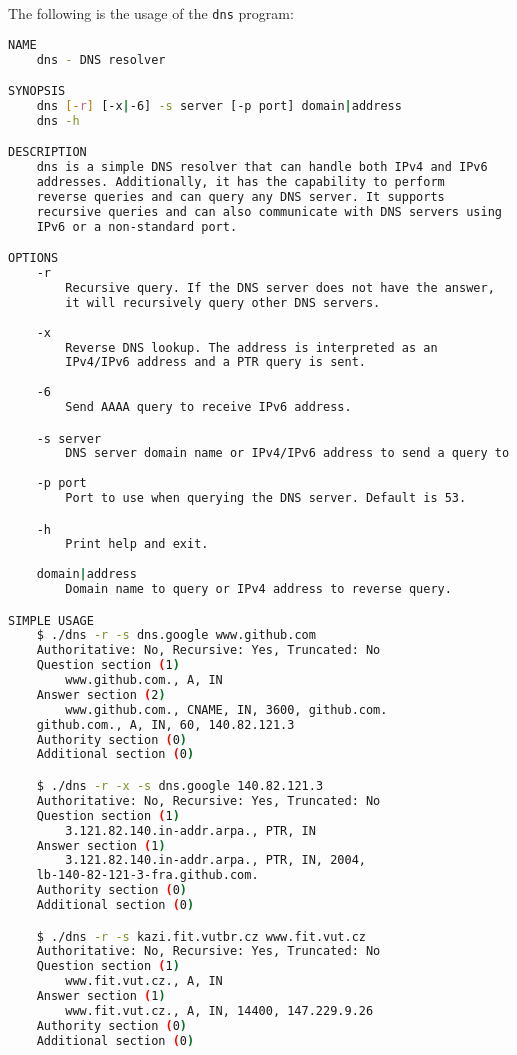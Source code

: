 \documentclass[a4paper, 11pt]{article}
\begin{document}
    The following is the usage of the \texttt{dns} program:
    \begin{lstlisting}[language=bash]
NAME
    dns - DNS resolver

SYNOPSIS
    dns [-r] [-x|-6] -s server [-p port] domain|address
    dns -h

DESCRIPTION
    dns is a simple DNS resolver that can handle both IPv4 and IPv6 
    addresses. Additionally, it has the capability to perform 
    reverse queries and can query any DNS server. It supports 
    recursive queries and can also communicate with DNS servers using 
    IPv6 or a non-standard port. 

OPTIONS
    -r
        Recursive query. If the DNS server does not have the answer, 
        it will recursively query other DNS servers.
    
    -x
        Reverse DNS lookup. The address is interpreted as an 
        IPv4/IPv6 address and a PTR query is sent.
    
    -6
        Send AAAA query to receive IPv6 address.

    -s server
        DNS server domain name or IPv4/IPv6 address to send a query to.
    
    -p port
        Port to use when querying the DNS server. Default is 53.

    -h
        Print help and exit.
    
    domain|address
        Domain name to query or IPv4 address to reverse query.

SIMPLE USAGE
    $ ./dns -r -s dns.google www.github.com
    Authoritative: No, Recursive: Yes, Truncated: No    
    Question section (1)
        www.github.com., A, IN
    Answer section (2)
        www.github.com., CNAME, IN, 3600, github.com.
    github.com., A, IN, 60, 140.82.121.3
    Authority section (0)
    Additional section (0)

    $ ./dns -r -x -s dns.google 140.82.121.3
    Authoritative: No, Recursive: Yes, Truncated: No    
    Question section (1)
        3.121.82.140.in-addr.arpa., PTR, IN
    Answer section (1)
        3.121.82.140.in-addr.arpa., PTR, IN, 2004, 
    lb-140-82-121-3-fra.github.com.
    Authority section (0)
    Additional section (0)  

    $ ./dns -r -s kazi.fit.vutbr.cz www.fit.vut.cz
    Authoritative: No, Recursive: Yes, Truncated: No
    Question section (1)
        www.fit.vut.cz., A, IN
    Answer section (1)
        www.fit.vut.cz., A, IN, 14400, 147.229.9.26
    Authority section (0)
    Additional section (0)


\end{lstlisting}
\end{document}
